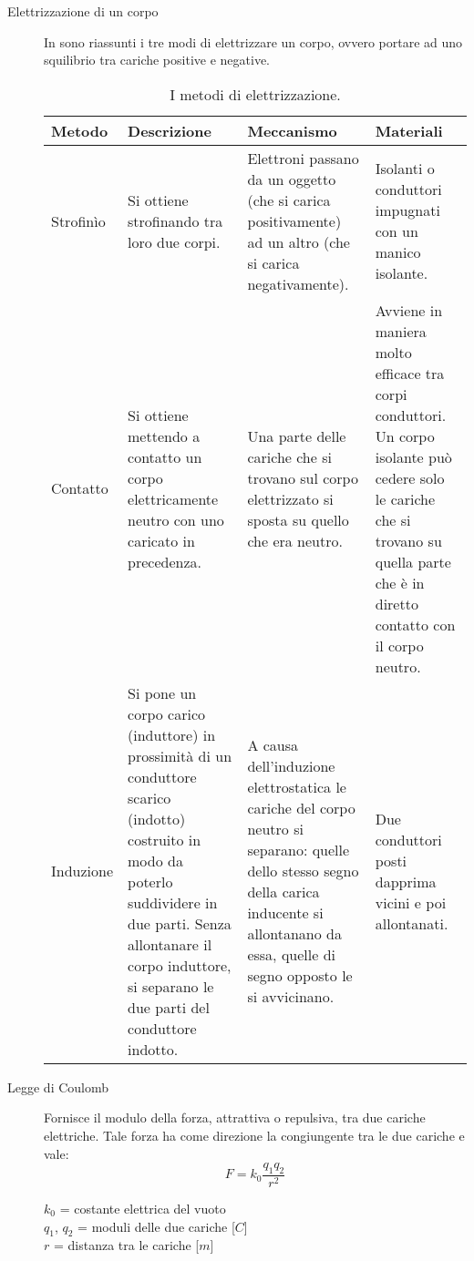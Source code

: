 \documentclass[a4paper,11pt,italian]{article}
\begin{document}
\begin{description}
  \item[Elettrizzazione di un corpo] 
  In  sono riassunti i tre modi di elettrizzare un corpo, ovvero portare ad uno squilibrio tra cariche positive e negative.

\begin{table}[htb]\centering\footnotesize
\begin{tabular}{p{} p{} p{} p{}}\toprule
\textbf{Metodo} & \textbf{Descrizione} & \textbf{Meccanismo} & \textbf{Materiali} \\\midrule
Strofinìo & Si ottiene strofinando tra loro due corpi. & Elettroni passano da un oggetto (che si carica positivamente) ad un altro (che si carica negativamente). & Isolanti o conduttori impugnati con un manico isolante.\\\addlinespace[1em]
Contatto & Si ottiene mettendo a contatto un corpo elettricamente neutro con uno caricato in precedenza. & Una parte delle cariche che si trovano sul corpo elettrizzato si sposta su quello che era neutro. & Avviene in maniera molto efficace tra corpi conduttori. Un corpo isolante può cedere solo le cariche che si trovano su quella parte che è in diretto contatto con il corpo neutro.\\\addlinespace[1em]
Induzione & Si pone un corpo carico (induttore) in prossimità di un conduttore scarico (indotto) costruito in modo da poterlo suddividere in due parti. Senza allontanare il corpo induttore, si separano le due parti del conduttore indotto. & A causa dell’induzione elettrostatica le cariche del corpo neutro si separano: quelle dello stesso segno della carica inducente si allontanano da essa, quelle di segno opposto le si avvicinano. & Due conduttori posti dapprima vicini e poi allontanati.\\\bottomrule
\end{tabular}
\caption{I metodi di elettrizzazione.}
\label{tab:elettrizzazione}
\end{table}
  
  \item[Legge di Coulomb] 
  Fornisce il modulo della forza, attrattiva o repulsiva, tra due cariche elettriche. Tale forza ha come direzione la congiungente tra le due cariche e vale:
  \[ F = k_0 \frac{q_1q_2}{r^2} \]
  \begin{multicols}{2}
  $ k_0 $ = costante elettrica del vuoto\\
  $ q_1 $, $ q_2 $ = moduli delle due cariche [$ C $]\\
  $ r $ = distanza tra le cariche [$ m $]
  \end{multicols}
  

\end{description}
\end{document}
